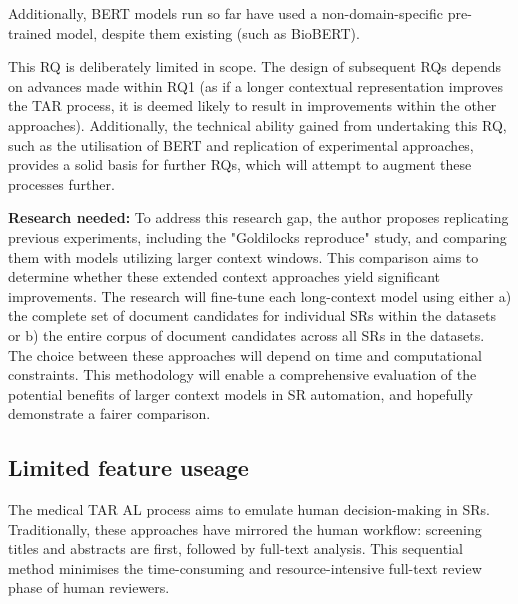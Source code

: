 \documentclass[../main.tex]{subfiles}
\begin{document}
Additionally, BERT models run so far have used a non-domain-specific pre-trained model, despite them existing (such as BioBERT).

This RQ is deliberately limited in scope. The design of subsequent RQs depends on advances made within RQ1 (as if a longer contextual representation improves the TAR process, it is deemed likely to result in improvements within the other approaches). Additionally, the technical ability gained from undertaking this RQ, such as the utilisation of BERT and replication of experimental approaches, provides a solid basis for further RQs, which will attempt to augment these processes further.

\textbf{Research needed:} To address this research gap, the author proposes replicating previous experiments, including the "Goldilocks reproduce" study, and comparing them with models utilizing larger context windows. This comparison aims to determine whether these extended context approaches yield significant improvements. The research will fine-tune each long-context model using either a) the complete set of document candidates for individual SRs within the datasets or b) the entire corpus of document candidates across all SRs in the datasets. The choice between these approaches will depend on time and computational constraints. This methodology will enable a comprehensive evaluation of the potential benefits of larger context models in SR automation, and hopefully demonstrate a fairer comparison.

\subsection{Limited feature useage}

The medical TAR AL process aims to emulate human decision-making in SRs. Traditionally, these approaches have mirrored the human workflow: screening titles and abstracts are first, followed by full-text analysis. This sequential method minimises the time-consuming and resource-intensive full-text review phase of human reviewers.
\end{document}
